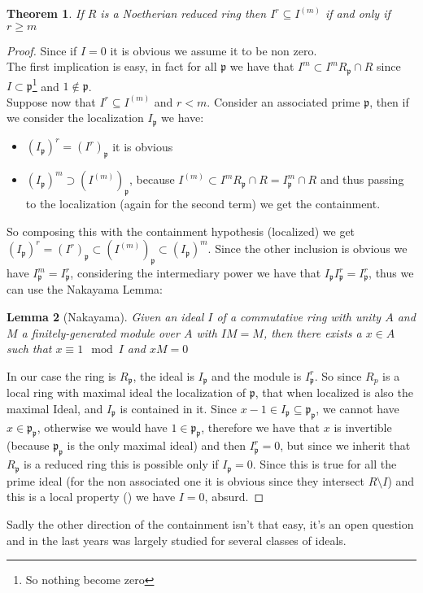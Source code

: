 \documentclass[notitlepage, a4]{book}
\theoremstyle{plain}
\newtheorem{teo}{Theorem}[section]
\newtheorem{lem}[teo]{Lemma}
\theoremstyle{remark}
\theoremstyle{definition}
\newcommand{\p}{\mathfrak{p}}
\newcounter{que}
\begin{document}
\begin{teo}\label{teo:inv_cont}
	If $ R $ is a Noetherian reduced ring then $ I^r \subseteq I^{(m)}$  if and only if $ r \geq m $
\end{teo}
\begin{proof}
	Since if $ I=0 $ it is obvious we assume it to be non zero.\\
	The first implication is easy, in fact for all $ \p $ we have that $ I^m \subset I^mR_\p \cap R $ since $ I \subset \p $\footnote{So nothing become zero} and $ 1 \not \in \p $.\\
	Suppose now that $ I^r \subseteq I^{(m)}$ and $ r < m $. Consider an associated prime $ \p $, then if we consider the localization $ I_\p $ we have:
	\begin{itemize}
	\item $ (I_\p)^r = (I^r)_\p $ it is obvious
	\item $ (I_\p)^m \supset (I^{(m)})_\p $, because $ I^{(m)} \subset I^mR_\p \cap R = I^m_\p \cap R $ and thus passing to the localization (again for the second term) we get the containment.
	\end{itemize}
	So composing this with the containment hypothesis (localized) we get $ (I_\p)^r = (I^r)_\p \subset (I^{(m)})_\p \subset (I_\p)^m $. Since the other inclusion is obvious we have $ I_\p^m= I_\p^r $, considering the intermediary power we have that $ I_\p I_\p^r =I_\p^r $, thus we can use the Nakayama Lemma:
	
	\begin{lem}[Nakayama] \label{lem:naka}
		Given an ideal $ I $ of a commutative ring with unity $ A $ and $ M $ a finitely-generated module over $ A $ with $ IM = M $, then there exists a $ x \in A $ such that $ x \equiv 1 \mod I $ and $ xM = 0 $
	\end{lem}
	In our case the ring is $ R_\p $, the ideal is $ I_\p $ and the module is $ I_\p^{r} $. So since $ R_p $ is a local ring with maximal ideal the localization of $ \p $, that when localized is also the maximal Ideal, and $ I_\p $ is contained in it. Since $ x -1 \in I_\p \subseteq \p_\p $, we cannot have $ x \in \p_\p $, otherwise we would have $ 1 \in \p_\p $, therefore we have that $ x $ is invertible (because $ \p_\p $ is the only maximal ideal) and then $ I_\p^r = 0 $, but since we inherit that $ R_\p $ is a reduced ring this is possible only if $ I_\p = 0$. Since this is true for all the prime ideal (for the non associated one it is obvious since they intersect $ R \setminus I $) and this is a local property (\cite[Proposition 3.8]{AMCD}) we have $ I = 0 $, absurd.
\end{proof} 
Sadly the other direction of the containment isn't that easy, it's an open question and in the last years was largely studied for several classes of ideals.
\end{document}
